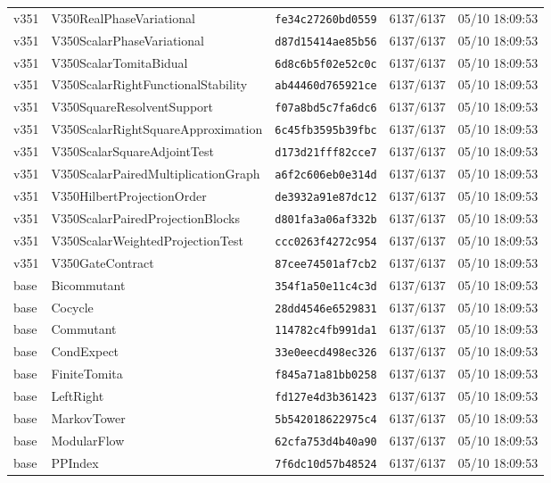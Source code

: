 \documentclass[11pt]{article}
\theoremstyle{definition}\newtheorem{deriv}{Derivação}
\begin{document}
{\begin{longtable}{@{}lllll@{}}
v351 & V350RealPhaseVariational & \texttt{fe34c27260bd0559} & 6137/6137 & 05/10 18:09:53 \\
v351 & V350ScalarPhaseVariational & \texttt{d87d15414ae85b56} & 6137/6137 & 05/10 18:09:53 \\
v351 & V350ScalarTomitaBidual & \texttt{6d8c6b5f02e52c0c} & 6137/6137 & 05/10 18:09:53 \\
v351 & V350ScalarRightFunctionalStability & \texttt{ab44460d765921ce} & 6137/6137 & 05/10 18:09:53 \\
v351 & V350SquareResolventSupport & \texttt{f07a8bd5c7fa6dc6} & 6137/6137 & 05/10 18:09:53 \\
v351 & V350ScalarRightSquareApproximation & \texttt{6c45fb3595b39fbc} & 6137/6137 & 05/10 18:09:53 \\
v351 & V350ScalarSquareAdjointTest & \texttt{d173d21fff82cce7} & 6137/6137 & 05/10 18:09:53 \\
v351 & V350ScalarPairedMultiplicationGraph & \texttt{a6f2c606eb0e314d} & 6137/6137 & 05/10 18:09:53 \\
v351 & V350HilbertProjectionOrder & \texttt{de3932a91e87dc12} & 6137/6137 & 05/10 18:09:53 \\
v351 & V350ScalarPairedProjectionBlocks & \texttt{d801fa3a06af332b} & 6137/6137 & 05/10 18:09:53 \\
v351 & V350ScalarWeightedProjectionTest & \texttt{ccc0263f4272c954} & 6137/6137 & 05/10 18:09:53 \\
v351 & V350GateContract & \texttt{87cee74501af7cb2} & 6137/6137 & 05/10 18:09:53 \\
base & Bicommutant & \texttt{354f1a50e11c4c3d} & 6137/6137 & 05/10 18:09:53 \\
base & Cocycle & \texttt{28dd4546e6529831} & 6137/6137 & 05/10 18:09:53 \\
base & Commutant & \texttt{114782c4fb991da1} & 6137/6137 & 05/10 18:09:53 \\
base & CondExpect & \texttt{33e0eecd498ec326} & 6137/6137 & 05/10 18:09:53 \\
base & FiniteTomita & \texttt{f845a71a81bb0258} & 6137/6137 & 05/10 18:09:53 \\
base & LeftRight & \texttt{fd127e4d3b361423} & 6137/6137 & 05/10 18:09:53 \\
base & MarkovTower & \texttt{5b542018622975c4} & 6137/6137 & 05/10 18:09:53 \\
base & ModularFlow & \texttt{62cfa753d4b40a90} & 6137/6137 & 05/10 18:09:53 \\
base & PPIndex & \texttt{7f6dc10d57b48524} & 6137/6137 & 05/10 18:09:53 \\

\end{longtable}}
\end{document}
